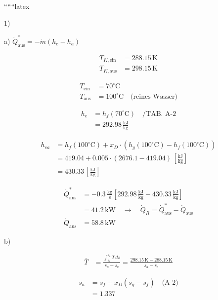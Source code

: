 
``````latex


1)

a) \(\dot{Q}_{\text{aus}}^* = -\dot{m} (h_e - h_a)\)

\[
\begin{aligned}
    T_{K,\text{ein}} &= 288.15 \, \text{K} \\
    T_{K,\text{aus}} &= 298.15 \, \text{K}
\end{aligned}
\]

\[
\begin{aligned}
    T_{\text{ein}} &= 70^\circ \text{C} \\
    T_{\text{aus}} &= 100^\circ \text{C} \quad \text{(reines Wasser)}
\end{aligned}
\]

\[
\begin{aligned}
    h_e &= h_f(70^\circ \text{C}) \quad \text{/TAB. A-2} \\
    &= 292.98 \, \frac{\text{kJ}}{\text{kg}}
\end{aligned}
\]

\[
\begin{aligned}
    h_{ea} &= h_f(100^\circ \text{C}) + x_D \cdot (h_g(100^\circ \text{C}) - h_f(100^\circ \text{C})) \\
    &= 419.04 + 0.005 \cdot (2676.1 - 419.04) \, \left[\frac{\text{kJ}}{\text{kg}}\right] \\
    &= 430.33 \, \left[\frac{\text{kJ}}{\text{kg}}\right]
\end{aligned}
\]

\[
\begin{aligned}
    \dot{Q}_{\text{aus}}^* &= -0.3 \, \frac{\text{kg}}{\text{s}} \left[ 292.98 \, \frac{\text{kJ}}{\text{kg}} - 430.33 \, \frac{\text{kJ}}{\text{kg}} \right] \\
    &= 41.2 \, \text{kW} \quad \rightarrow \quad \dot{Q}_R = \dot{Q}_{\text{aus}}^* - \dot{Q}_{\text{aus}} \\
    \dot{Q}_{\text{aus}} &= 58.8 \, \text{kW}
\end{aligned}
\]

b)

\[
\begin{aligned}
    \overline{T} &= \frac{\int_{s_e}^{s_a} T \, ds}{s_a - s_e} = \frac{298.15 \, \text{K} - 288.15 \, \text{K}}{s_a - s_e}
\end{aligned}
\]

\[
\begin{aligned}
    s_a &= s_f + x_D (s_g - s_f) \quad \text{(A-2)} \\
    &= 1.337
\end{aligned}
\]

